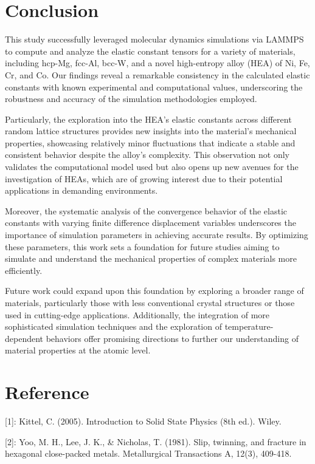 \documentclass[a4paper,11pt]{article} %
\begin{document}
\clearpage
\section*{Conclusion}

This study successfully leveraged molecular dynamics simulations via LAMMPS to compute and analyze the elastic constant tensors for a variety of materials, including hcp-Mg, fcc-Al, bcc-W, and a novel high-entropy alloy (HEA) of Ni, Fe, Cr, and Co. Our findings reveal a remarkable consistency in the calculated elastic constants with known experimental and computational values, underscoring the robustness and accuracy of the simulation methodologies employed.

Particularly, the exploration into the HEA's elastic constants across different random lattice structures provides new insights into the material's mechanical properties, showcasing relatively minor fluctuations that indicate a stable and consistent behavior despite the alloy's complexity. This observation not only validates the computational model used but also opens up new avenues for the investigation of HEAs, which are of growing interest due to their potential applications in demanding environments.

Moreover, the systematic analysis of the convergence behavior of the elastic constants with varying finite difference displacement variables underscores the importance of simulation parameters in achieving accurate results. By optimizing these parameters, this work sets a foundation for future studies aiming to simulate and understand the mechanical properties of complex materials more efficiently.

Future work could expand upon this foundation by exploring a broader range of materials, particularly those with less conventional crystal structures or those used in cutting-edge applications. Additionally, the integration of more sophisticated simulation techniques and the exploration of temperature-dependent behaviors offer promising directions to further our understanding of material properties at the atomic level.


\section*{Reference}
[1]: Kittel, C. (2005). Introduction to Solid State Physics (8th ed.). Wiley.

[2]: Yoo, M. H., Lee, J. K., \& Nicholas, T. (1981). Slip, twinning, and fracture in hexagonal close-packed metals. Metallurgical Transactions A, 12(3), 409-418.
\end{document}
